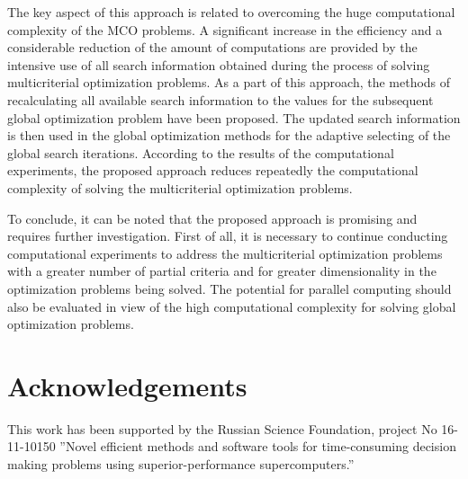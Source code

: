 \documentclass[smallcondensed]{svjour3}     %
\begin{document}
The key aspect of this approach is related to overcoming the huge computational complexity of the MCO problems. A significant increase in the efficiency and a considerable reduction of the amount of computations are provided by the intensive use of all search information obtained during the process of solving multicriterial optimization problems. As a part of this approach, the methods of recalculating all available search information to the values for the subsequent global optimization problem have been proposed. The updated search information is then used in the global optimization methods for the adaptive selecting of the global search iterations. According to the results of the computational experiments, the proposed approach reduces repeatedly the computational complexity of solving the multicriterial optimization problems.\par

To conclude, it can be noted that the proposed approach is promising and requires further investigation. First of all, it is necessary to continue conducting computational experiments to address the multicriterial optimization problems with a greater number of partial criteria and for greater dimensionality in the optimization problems being solved. The potential for parallel computing should also be evaluated in view of the high computational complexity for solving global optimization problems.

\section*{Acknowledgements}  
This work has been supported by the Russian Science Foundation, project No 16-11-10150 ''Novel efficient methods and software tools for time-consuming decision making problems using superior-performance supercomputers.''
\end{document}

